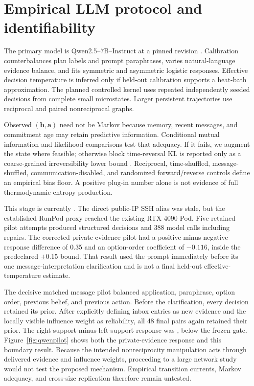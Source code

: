\documentclass[12pt]{article}
\begin{document}
\section{Empirical LLM protocol and identifiability}

The primary model is Qwen2.5--7B--Instruct at a pinned revision
\cite{qwen2025}. Calibration counterbalances plan labels and prompt paraphrases,
varies natural-language evidence balance, and fits symmetric and asymmetric
logistic responses. Effective decision temperature is inferred only if held-out
calibration supports a heat-bath approximation. The planned controlled kernel
uses repeated independently seeded decisions from complete small microstates.
Larger persistent trajectories use reciprocal and paired nonreciprocal graphs.

Observed $(\bm b,\bm a)$ need not be Markov because memory, recent messages, and
commitment age may retain predictive information. Conditional mutual
information and likelihood comparisons test that adequacy. If it fails, we
augment the state where feasible; otherwise block time-reversal KL is reported
only as a coarse-grained irreversibility lower bound
\cite{roldan2012,kawaguchi2013}. Reciprocal, time-shuffled, message-shuffled,
communication-disabled, and randomized forward/reverse controls define an
empirical bias floor. A positive plug-in number alone is not evidence of full
thermodynamic entropy production.

This stage is currently \ResultLLMStatus. The direct public-IP SSH alias was
stale, but the established RunPod proxy reached the existing RTX 4090 Pod.
Five retained pilot attempts produced \ResultLLMDecisions{} structured
decisions and 388 model calls including repairs. The corrected private-evidence
pilot had a positive-minus-negative response difference of 0.35 and an
option-order coefficient of $-0.116$, inside the predeclared $\pm0.15$ bound.
That result used the prompt immediately before its one message-interpretation
clarification and is not a final held-out effective-temperature estimate.

The decisive matched message pilot balanced application, paraphrase, option
order, previous belief, and previous action. Before the clarification, every
decision retained its prior. After explicitly defining inbox entries as new
evidence and the locally visible influence weight as reliability, all 48 final
pairs again retained their prior. The right-support minus left-support response
was \ResultLLMMessageEffect{}, below the frozen
\ResultLLMMessageGate{} gate. Figure~\ref{fig:qwenpilot} shows both the
private-evidence response and this boundary result. Because the intended
nonreciprocity manipulation acts through delivered evidence and influence
weights, proceeding to a large network study would not test the proposed
mechanism. Empirical transition currents, Markov adequacy, and cross-size
replication therefore remain untested.
\end{document}
